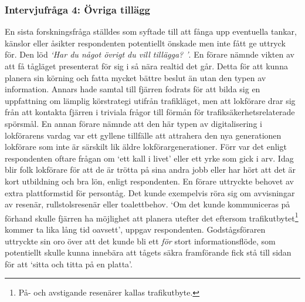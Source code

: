 \subsubsection{Intervjufråga 4: Övriga tillägg}
En sista forskningsfråga ställdes som syftade till att fånga upp eventuella tankar, känslor eller åsikter respondenten potentiellt önskade men inte fått ge uttryck för.
Den löd \emph{\lq{}Har du något övrigt du vill tillägga? \rq{}}.
En förare nämnde vikten av att få tågläget presenterat för sig i så nära realtid det går.
Detta för att kunna planera sin körning och fatta mycket bättre beslut än utan den typen av information.
Annars hade samtal till fjärren fodrats för att bilda sig en uppfattning om lämplig körstrategi utifrån trafikläget, men att lokförare drar sig från att kontakta fjärren i triviala frågor till förmån för trafiksäkerhetsrelaterade spörsmål.
En annan förare nämnde att den här typen av digitalisering i lokförarens vardag var ett gyllene tillfälle att attrahera den nya generationen lokförare som inte är särskilt lik äldre lokförargenerationer.
Förr var det enligt respondenten oftare frågan om \lq{}ett kall i livet\rq{} eller ett yrke som gick i arv.
Idag blir folk lokförare för att de är trötta på sina andra jobb eller har hört att det är kort utbildning och bra lön, enligt respondenten.
En förare uttryckte behovet av extra plattformstid för persontåg.
Det kunde exempelvis röra sig om avvisningar av resenär, rullstolsresenär eller toalettbehov.
\lq{}Om det kunde kommuniceras på förhand skulle fjärren ha möjlighet att planera utefter det eftersom trafikutbytet\footnote{På- och avstigande resenärer kallas trafikutbyte.} kommer ta lika lång tid oavsett\rq{}, uppgav respondenten.
Godstågsföraren uttryckte sin oro över att det kunde bli ett \emph{för} stort informationsflöde, som potentiellt skulle kunna innebära att tågets säkra framförande fick stå till sidan för att \lq{}sitta och titta på en platta\rq{}.
